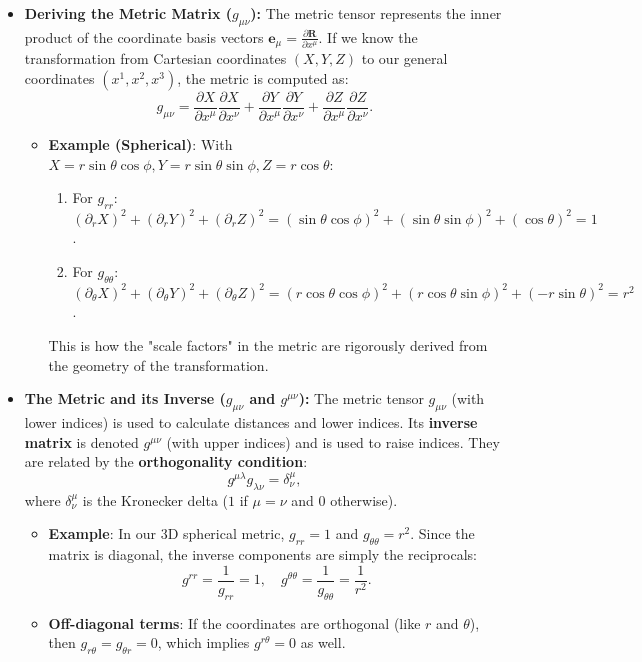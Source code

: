 \begin{solution}
\begin{itemize}
    \item \textbf{Deriving the Metric Matrix ($g_{\mu\nu}$):}
    The metric tensor represents the inner product of the coordinate basis vectors $\mathbf{e}_\mu = \frac{\partial \mathbf{R}}{\partial x^\mu}$. If we know the transformation from Cartesian coordinates $(X, Y, Z)$ to our general coordinates $(x^1, x^2, x^3)$, the metric is computed as:
    \[ g_{\mu\nu} = \frac{\partial X}{\partial x^\mu} \frac{\partial X}{\partial x^\nu} + \frac{\partial Y}{\partial x^\mu} \frac{\partial Y}{\partial x^\nu} + \frac{\partial Z}{\partial x^\mu} \frac{\partial Z}{\partial x^\nu}. \]
    \begin{itemize}
        \item \textbf{Example (Spherical)}: With $X = r \sin\theta \cos\phi, Y = r \sin\theta \sin\phi, Z = r \cos\theta$:
        \begin{enumerate}
            \item For $g_{rr}$: $(\partial_r X)^2 + (\partial_r Y)^2 + (\partial_r Z)^2 = (\sin\theta\cos\phi)^2 + (\sin\theta\sin\phi)^2 + (\cos\theta)^2 = 1$.
            \item For $g_{\theta\theta}$: $(\partial_\theta X)^2 + (\partial_\theta Y)^2 + (\partial_\theta Z)^2 = (r\cos\theta\cos\phi)^2 + (r\cos\theta\sin\phi)^2 + (-r\sin\theta)^2 = r^2$.
        \end{enumerate}
        This is how the "scale factors" in the metric are rigorously derived from the geometry of the transformation.
    \end{itemize}

    \item \textbf{The Metric and its Inverse ($g_{\mu\nu}$ and $g^{\mu\nu}$):}
    The metric tensor $g_{\mu\nu}$ (with lower indices) is used to calculate distances and lower indices. Its \textbf{inverse matrix} is denoted $g^{\mu\nu}$ (with upper indices) and is used to raise indices. They are related by the \textbf{orthogonality condition}:
    \[ g^{\mu\lambda} g_{\lambda\nu} = \delta^\mu_\nu, \]
    where $\delta^\mu_\nu$ is the Kronecker delta ($1$ if $\mu=\nu$ and $0$ otherwise). 
    \begin{itemize}
        \item \textbf{Example}: In our 3D spherical metric, $g_{rr} = 1$ and $g_{\theta\theta} = r^2$. Since the matrix is diagonal, the inverse components are simply the reciprocals:
        \[ g^{rr} = \frac{1}{g_{rr}} = 1, \quad g^{\theta\theta} = \frac{1}{g_{\theta\theta}} = \frac{1}{r^2}. \]
        \item \textbf{Off-diagonal terms}: If the coordinates are orthogonal (like $r$ and $\theta$), then $g_{r\theta} = g_{\theta r} = 0$, which implies $g^{r\theta} = 0$ as well.
    \end{itemize}


\end{itemize}
\end{solution}
